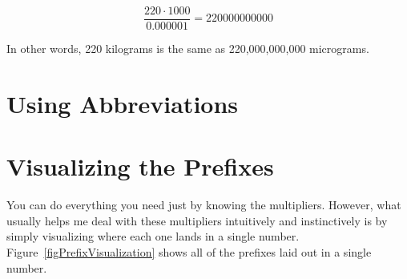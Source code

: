 $$\frac{220 \cdot 1000}{0.000001} = 220000000000$$

In other words, 220 kilograms is the same as 220,000,000,000 micrograms.

\section{Using Abbreviations}

\section{Visualizing the Prefixes}

You can do everything you need just by knowing the multipliers.
However, what usually helps me deal with these multipliers intuitively and instinctively is by simply visualizing where each one lands in a single number.
Figure~\ref{figPrefixVisualization} shows all of the prefixes laid out in a single number.



